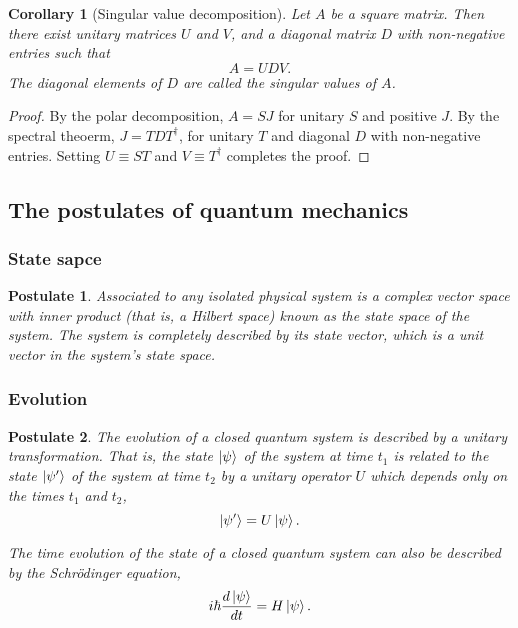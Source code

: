 \documentclass{article}
\numberwithin{theorem}{section}
\newtheorem{corollary}{Corollary}
\numberwithin{corollary}{section}
\newtheorem{postulate}{Postulate}
\numberwithin{postulate}{section}
\begin{document}
\begin{corollary}[Singular value decomposition]
  Let $A$ be a square matrix. Then there exist unitary matrices $U$ and $V$,
  and a diagonal matrix $D$ with non-negative entries such that \[
    A = UDV.
  \] The diagonal elements of $D$ are called the \emph{singular values} of $A$.
\end{corollary}
\begin{proof}
  By the polar decomposition, $A = SJ$ for unitary $S$ and positive $J$. By the
  spectral theoerm, $J = TDT^{\dagger}$, for unitary $T$ and diagonal $D$ with
  non-negative entries. Setting $U \equiv ST$ and $V \equiv T^{\dagger}$
  completes the proof.
\end{proof}

\subsection{The postulates of quantum mechanics}

\subsubsection{State sapce}

\begin{postulate}
  Associated to any isolated physical system is a complex vector space with
  inner product (that is, a Hilbert space) known as the \emph{state space} of
  the system. The system is completely described by its \emph{state vector},
  which is a unit vector in the system's state space.
\end{postulate}

\subsubsection{Evolution}

\begin{postulate}
  The evolution of a \emph{closed} quantum system is described by a
  \emph{unitary transformation}. That is, the state $\ket{\psi}$ of the system
  at time $t_1$ is related to the state $\ket{\psi'}$ of the system at time
  $t_2$ by a unitary operator $U$ which depends only on the times $t_1$ and
  $t_2$, \[
    \ket{\psi'} = U\ket{\psi}.
  \]

  The time evolution of the state of a closed quantum system can also be
  described by the \emph{Schr\"{o}dinger equation}, \[
    i\hbar\frac{d\ket{\psi}}{dt} = H\ket{\psi}.
  \]
\end{postulate}
\end{document}
